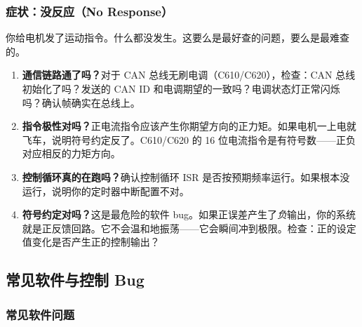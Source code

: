 \subsubsection{症状：没反应（No Response）}

你给电机发了运动指令。什么都没发生。这要么是最好查的问题，要么是最难查的。

\begin{enumerate}
    \item \textbf{通信链路通了吗？}对于 CAN 总线无刷电调（C610/C620），检查：CAN 总线初始化了吗？发送的 CAN ID 和电调期望的一致吗？电调状态灯正常闪烁吗？确认帧确实在总线上。

    \item \textbf{指令极性对吗？}正电流指令应该产生你期望方向的正力矩。如果电机一上电就飞车，说明符号约定反了。C610/C620 的 16 位电流指令是有符号数——正负对应相反的力矩方向。

    \item \textbf{控制循环真的在跑吗？}确认控制循环 ISR 是否按预期频率运行。如果根本没运行，说明你的定时器中断配置不对。

    \item \textbf{符号约定对吗？}这是最危险的软件 bug。如果正误差产生了\textit{负}输出，你的系统就是正反馈回路。它不会温和地振荡——它会瞬间冲到极限。检查：正的设定值变化是否产生正的控制输出？
\end{enumerate}

\subsection{常见软件与控制 Bug}

\subsubsection{常见软件问题}

